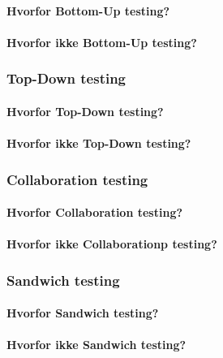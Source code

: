 \paragraph{Hvorfor Bottom-Up testing?}

\paragraph{Hvorfor ikke Bottom-Up testing?}



\subsubsection{Top-Down testing}

\paragraph{Hvorfor Top-Down testing?}

\paragraph{Hvorfor ikke Top-Down testing?}



\subsubsection{Collaboration testing}

\paragraph{Hvorfor Collaboration testing?}

\paragraph{Hvorfor ikke Collaborationp testing?}



\subsubsection{Sandwich testing}

\paragraph{Hvorfor Sandwich testing?}

\paragraph{Hvorfor ikke Sandwich testing?}
